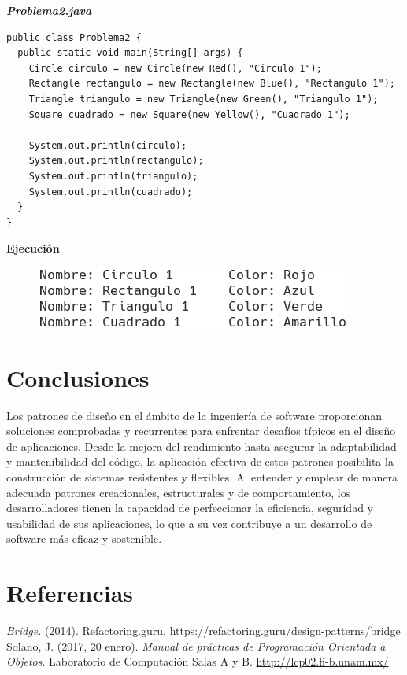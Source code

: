 \documentclass[11pt, twocolumn]{article}
\begin{document}
  \textit{\textbf{Problema2.java}}
  \begin{lstlisting}
public class Problema2 {
  public static void main(String[] args) {
    Circle circulo = new Circle(new Red(), "Circulo 1");
    Rectangle rectangulo = new Rectangle(new Blue(), "Rectangulo 1");
    Triangle triangulo = new Triangle(new Green(), "Triangulo 1");
    Square cuadrado = new Square(new Yellow(), "Cuadrado 1");

    System.out.println(circulo);
    System.out.println(rectangulo);
    System.out.println(triangulo);
    System.out.println(cuadrado);
  }
}
  \end{lstlisting}

  \textbf{Ejecución}
  \begin{figure}[h!]
    \centering
    \includegraphics[width=0.75\columnwidth]{13P2.png}
  \end{figure}

  \section*{Conclusiones}
  Los patrones de diseño en el ámbito de la ingeniería de software proporcionan soluciones comprobadas y recurrentes para enfrentar desafíos típicos en el diseño de aplicaciones. Desde la mejora del rendimiento hasta asegurar la adaptabilidad y mantenibilidad del código, la aplicación efectiva de estos patrones posibilita la construcción de sistemas resistentes y flexibles. Al entender y emplear de manera adecuada patrones creacionales, estructurales y de comportamiento, los desarrolladores tienen la capacidad de perfeccionar la eficiencia, seguridad y usabilidad de sus aplicaciones, lo que a su vez contribuye a un desarrollo de software más eficaz y sostenible.

  \section*{Referencias}
  \begin{small}
    \textit{Bridge.} (2014). Refactoring.guru. \url{https://refactoring.guru/design-patterns/bridge} \\

    Solano, J. (2017, 20 enero). \textit{Manual de prácticas de Programación Orientada a Objetos}. Laboratorio de Computación Salas A y B. \url{http://lcp02.fi-b.unam.mx/} \\
  \end{small}
\end{document}

